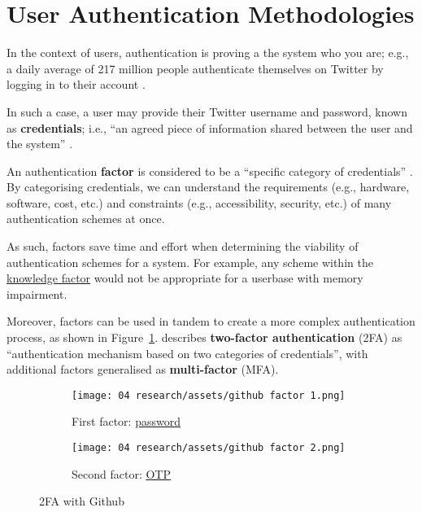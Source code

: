 \section{User Authentication Methodologies}
\label{s:userAuth}

In the context of users, \gls{authentication} is proving a
the system who you are; e.g., a daily average of 217
million people authenticate themselves on Twitter by
logging in to their account \parencite[][Q4]{twitterUsage}.

In such a case, a user may provide their Twitter username
and password, known as \textbf{credentials}; i.e.,
\enquote{an agreed piece of information shared between the
  user and the system} \parencite{whatIsAuth}.

An authentication \textbf{factor} is considered to be a
\enquote{specific category of credentials}
\parencite{whatIsAuth}.
By categorising credentials, we can understand the
requirements (e.g., hardware, software, cost, etc.) and
constraints (e.g., accessibility, security, etc.) of many
authentication schemes at once.

As such, factors save time and effort when determining the
viability of authentication schemes for a system.
For example, any scheme within the
\hyperref[p:knowledge]{knowledge factor} would not be
appropriate for a userbase with memory impairment.

Moreover, factors can be used in tandem to create a more
complex authentication process, as shown in
Figure~\ref{fig:github2fa}.
\cite{whatIsAuth} describes
\textbf{two-factor authentication} (2FA) as
\enquote{authentication mechanism based on two categories
  of credentials}, with additional factors generalised as
\textbf{multi-factor} (MFA).

\begin{figure}[h]
  \centering
  \begin{subfigure}{\subfigwidth}
    \centering
    \texttt{[image: 04
      research/assets/github factor 1.png]}
    \caption{First factor:
      \hyperref[ss:passwords]{password}}
  \end{subfigure}
  \begin{subfigure}{\subfigwidth}
    \centering
    \texttt{[image: 04
      research/assets/github factor 2.png]}
    \caption{Second factor: \hyperref[ss:otp]{OTP}}

  \end{subfigure}

  \caption{2FA with Github}
  \label{fig:github2fa}
\end{figure}

